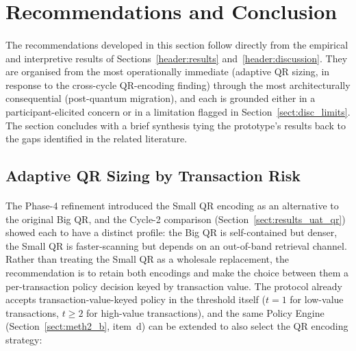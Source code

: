 \section{Recommendations and Conclusion}
\label{header:recs}

\paragraph{}The recommendations developed in this section follow directly from the empirical and interpretive results of Sections~\ref{header:results} and~\ref{header:discussion}. They are organised from the most operationally immediate (adaptive QR sizing, in response to the cross-cycle QR-encoding finding) through the most architecturally consequential (post-quantum migration), and each is grounded either in a participant-elicited concern or in a limitation flagged in Section~\ref{sect:disc_limits}. The section concludes with a brief synthesis tying the prototype's results back to the gaps identified in the related literature.

\subsection{Adaptive QR Sizing by Transaction Risk}
\label{sect:rec_adaptive}

\paragraph{}The Phase-4 refinement introduced the Small QR encoding as an alternative to the original Big QR, and the Cycle-2 comparison (Section~\ref{sect:results_uat_qr}) showed each to have a distinct profile: the Big QR is self-contained but denser, the Small QR is faster-scanning but depends on an out-of-band retrieval channel. Rather than treating the Small QR as a wholesale replacement, the recommendation is to retain both encodings and make the choice between them a per-transaction policy decision keyed by transaction value. The protocol already accepts transaction-value-keyed policy in the threshold itself ($t = 1$ for low-value transactions, $t \geq 2$ for high-value transactions), and the same Policy Engine (Section~\ref{sect:meth2_b}, item~d) can be extended to also select the QR encoding strategy:


